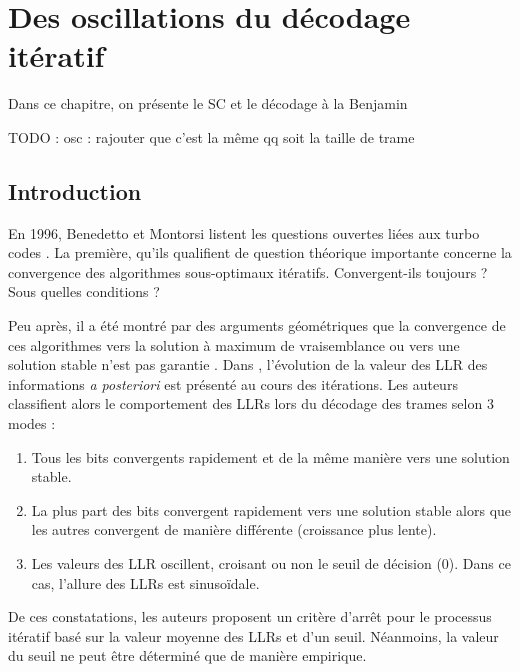 \chapter{Des oscillations du décodage itératif} %

Dans ce chapitre, on présente le SC et le décodage  à la Benjamin

TODO : osc : rajouter que c'est la même qq soit la taille de trame

\vspace*{\fill}
\minitocTITI
\vspace*{\fill}
\newpage

\section{Introduction}\label{sec:ch2_intro} 
En 1996, Benedetto et Montorsi listent les questions ouvertes liées aux turbo codes \cite{benedetto_unveiling}. La
première, qu'ils qualifient de \og question théorique importante \fg concerne la convergence des algorithmes 
sous-optimaux itératifs. \og Convergent-ils toujours ? Sous quelles conditions ? \fg

Peu après, il a été montré par des arguments géométriques que la convergence de ces algorithmes vers la solution à 
maximum de vraisemblance ou vers une solution stable n'est pas garantie \cite{richardson_geometry}.
Dans \cite{reid_convergence}, l'évolution de la valeur des LLR des informations \textit{a posteriori} est présenté au 
cours des itérations. Les auteurs classifient alors le comportement des LLRs lors du décodage des trames selon 3 modes : 
\begin{enumerate}
	\item Tous les bits convergents rapidement et de la même manière vers une solution stable.
	\item La plus part des bits convergent rapidement vers une solution stable alors que les autres convergent de manière 
	différente (croissance plus lente).
	\item Les valeurs des LLR oscillent, croisant ou non le seuil de décision (0). Dans ce cas, l'allure des LLRs est 
	sinusoïdale.
\end{enumerate}
De ces constatations, les auteurs proposent un critère d'arrêt pour le processus itératif basé sur la valeur moyenne des 
LLRs et d'un seuil. Néanmoins, la valeur du seuil ne peut être déterminé que de manière empirique. %

